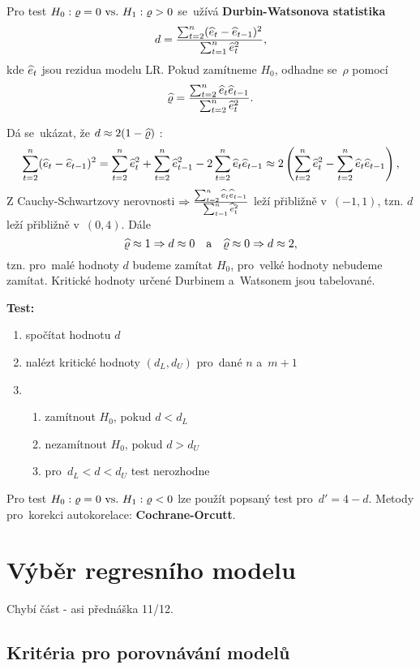 Pro test $H_0: \varrho = 0 ~\text{vs.}~ H_1: \varrho > 0$ se~užívá \textbf{Durbin-Watsonova statistika}
 $$
d = \frac{\sum_{t = 2}^n(\widehat{e}_t - \widehat{e}_{t-1})^2}{\sum_{t = 1}^n \widehat{e}_t^2},
 $$
kde $\widehat{e}_t$ jsou rezidua modelu LR. Pokud zamítneme $H_0$, odhadne se~$\rho$ pomocí
 $$
\widehat{\varrho} = \frac{\sum_{t = 2}^n \widehat{e}_t \widehat{e}_{t-1}}{\sum_{t = 2}^n \widehat{e}_t^2}.
 $$

\newcommand{\sumtn}{\sum_{t = 2}^n}
\begin{remark}
Dá se~ukázat, že $d \approx 2(1-\widehat{\varrho})$ :
 $$
\sum_{t = 2}^n(\he_t - \he_{t-1})^2 = \sumtn \he_t^2 + \sumtn \he_{t-1}^2 - 2 \sumtn \he_t \he_{t-1} \approx 2 \left(\sumtn \he_t^2 - \sumtn \he_t \he_{t-1} \right),
 $$
Z Cauchy-Schwartzovy nerovnosti $\Rightarrow \frac{\sumtn \he_t \he_{t-1}}{\sum_{t = 1}^n \he_t^2}$ leží přibližně v~$(-1,1)$, tzn. $d$ leží přibližně v~$(0,4)$. Dále
 $$
\widehat{\varrho} \approx 1 \Rightarrow d \approx 0 \quad \text{a} \quad \widehat{\varrho} \approx 0 \Rightarrow d \approx 2,
 $$
tzn. pro~malé hodnoty $d$ budeme zamítat $H_0$, pro~velké hodnoty nebudeme zamítat. Kritické hodnoty určené Durbinem a~Watsonem jsou tabelované.
\end{remark}

\noindent \textbf{Test:}
\begin{enumerate}
	\item spočítat hodnotu $d$
	\item nalézt kritické hodnoty $(d_L,d_U)$ pro~dané $n$ a~$m+1$
	\item \begin{enumerate}
		\item zamítnout $H_0$, pokud $d < d_L$
		\item nezamítnout $H_0$, pokud $d > d_U$
		\item pro~$d_L < d < d_U$ test nerozhodne
	\end{enumerate}
\end{enumerate}

\begin{remark}
	Pro test $H_0: \varrho = 0 ~\text{vs.}~ H_1: \varrho < 0$ lze použít popsaný test pro~$d' = 4 - d$. Metody pro~korekci autokorelace: \textbf{Cochrane-Orcutt}.
\end{remark}

\chapter{Výběr regresního modelu}

Chybí část - asi přednáška 11/12.

\section{Kritéria pro porovnávání modelů}

